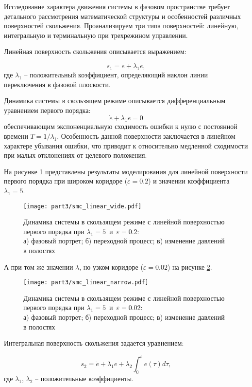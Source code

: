 Исследование характера движения системы в фазовом пространстве требует детального рассмотрения математической
структуры и особенностей различных поверхностей скольжения.
Проанализируем три типа поверхностей: линейную, интегральную и терминальную при трехрежином управлении.

Линейная поверхность скольжения описывается выражением:

$$
	s_1 = \dot{e} + \lambda_1 e,
$$
где $\lambda_1$ -- положительный коэффициент, определяющий наклон линии переключения в
фазовой плоскости.

Динамика системы в скользящем режиме описывается дифференциальным уравнением первого порядка:
$$
	\dot{e} + \lambda_1 e = 0
$$
обеспечивающим экспоненциальную сходимость ошибки к нулю с постоянной
времени $T = 1/\lambda_1$. Особенность данной поверхности заключается в
линейном характере убывания ошибки, что приводит к
относительно медленной сходимости при малых отклонениях от целевого положения.

На рисунке \ref{fig:smc_linear_wide} представлены результаты моделирования для линейной поверхности первого порядка при широком коридоре
($\varepsilon = \num{0.2}$) и значении коэффициента $\lambda_1 = 5$.

\begin{figure}[ht]
	\centering
	\texttt{[image: part3/smc\_linear\_wide.pdf]}
	\caption{Динамика системы в скользящем режиме с линейной поверхностью первого порядка при $\lambda_1 = \num{5}$~и~$\varepsilon=\num{0.2}$: \\
		а) фазовый портрет; б) переходной процесс; в) изменение давлений в полостях}
	\label{fig:smc_linear_wide}
\end{figure}

А при том же значении $\lambda$, но узком коридоре ($\varepsilon = \num{0.02}$) на рисунке \ref{fig:smc_linear_narrow}.

\begin{figure}[ht]
	\centering
	\texttt{[image: part3/smc\_linear\_narrow.pdf]}
	\caption{Динамика системы в скользящем режиме с линейной поверхностью первого порядка при $\lambda_1 = \num{5}$~и~$\varepsilon=\num{0.02}$: \\
		а) фазовый портрет; б) переходной процесс; в) изменение давлений в полостях}
	\label{fig:smc_linear_narrow}
\end{figure}

Интегральная поверхность скольжения задается уравнением:

$$
	s_2 = \dot{e} + \lambda_1 e + \lambda_2 \int_0^t e(\tau)d\tau,
$$
где $\lambda_1$, $\lambda_2$ -- положительные коэффициенты.

